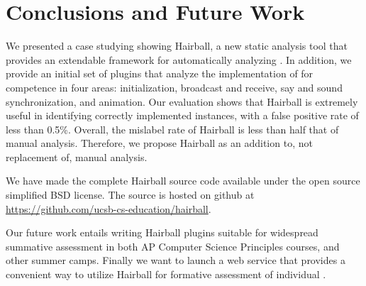 \section{Conclusions and Future Work} 

We presented a case studying showing Hairball, a new static analysis tool that
provides an extendable framework for automatically analyzing .  In
addition, we provide an initial set of plugins that analyze the implementation
of  for competence in four areas: initialization, broadcast and
receive, say and sound synchronization, and animation.  Our evaluation shows
that Hairball is extremely useful in identifying correctly implemented
instances, with a false positive rate of less than 0.5\%.  Overall, the
mislabel rate of Hairball is less than half that of manual analysis.
Therefore, we propose Hairball as an addition to, not replacement of, manual
analysis.

We have made the complete Hairball source code available under the open source
simplified BSD license. The source is hosted on github at\\
\url{https://github.com/ucsb-cs-education/hairball}.

Our future work entails writing Hairball plugins suitable for wide\-spread
summative assessment in both AP Computer Science Principles courses, and other
summer camps. Finally we want to launch a web service that provides a
convenient way to utilize Hairball for formative assessment of individual
.
